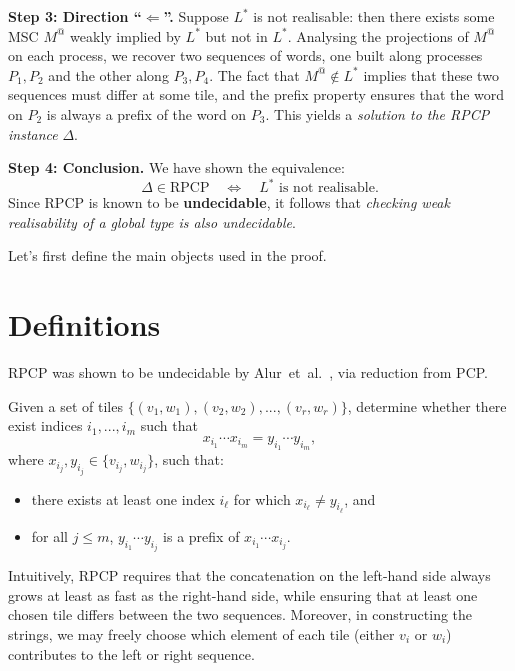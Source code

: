 \bigskip

\textbf{Step 3: Direction ``$\Leftarrow$''.}
Suppose $L^*$ is not realisable: then there exists some MSC $M^@$
weakly implied by $L^*$ but not in $L^*$. Analysing the projections
of $M^@$ on each process, we recover two sequences of words, one
built along processes $P_1,P_2$ and the other along $P_3,P_4$. The
fact that $M^@ \notin L^*$ implies that these two sequences must
differ at some tile, and the prefix property ensures that the word
on $P_2$ is always a prefix of the word on $P_3$. This yields a
\emph{solution to the RPCP instance} $\Delta$.

\bigskip

\textbf{Step 4: Conclusion.}
We have shown the equivalence:
\[
\Delta \in \text{RPCP} \quad\iff\quad L^* \text{ is not realisable}.
\]
Since RPCP is known to be \textbf{undecidable}, it follows that
\emph{checking weak realisability of a global type is also
undecidable}.

\bigskip

Let's first define the main objects used in the proof.

\section{Definitions}
RPCP was shown to be 
undecidable by Alur~et~al.~\cite{alur2005realizability}, via reduction 
from PCP.

\bigskip

\begin{definition}
	Given a set of tiles $\{(v_1, w_1), (v_2, w_2), ..., (v_r, w_r)\}$, 
	determine whether there exist indices $i_1, ..., i_m$ such that
	$$x_{i_1}\cdots x_{i_m} = y_{i_1}\cdots y_{i_m},$$
	where $x_{i_j}, y_{i_j} \in \{v_{i_j}, w_{i_j}\}$, such that:
	\begin{itemize}
		\item there exists at least one index $i_\ell$ for which $x_{i_\ell}\neq y_{i_\ell}$, and
		\item for all $j \leq m$, $y_{i_1}\cdots y_{i_j}$ is a prefix of $x_{i_1}\cdots x_{i_j}$.
	\end{itemize}
\end{definition}

Intuitively, RPCP requires that the concatenation on the left-hand side always 
grows at least as fast as the right-hand side, while ensuring that at least one 
chosen tile differs between the two sequences. Moreover, in constructing the 
strings, we may freely choose which element of each tile (either $v_i$ or $w_i$) 
contributes to the left or right sequence.


